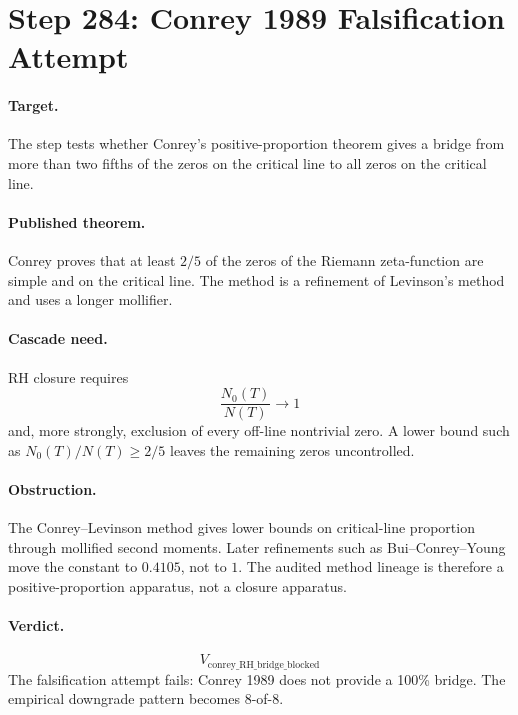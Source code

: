 \section*{Step 284: Conrey 1989 Falsification Attempt}

\paragraph{Target.}
The step tests whether Conrey's positive-proportion theorem gives a bridge from more than two fifths of the zeros on the critical line to all zeros on the critical line.

\paragraph{Published theorem.}
Conrey proves that at least \(2/5\) of the zeros of the Riemann zeta-function are simple and on the critical line.  The method is a refinement of Levinson's method and uses a longer mollifier.

\paragraph{Cascade need.}
RH closure requires
\[
  \frac{N_0(T)}{N(T)} \to 1
\]
and, more strongly, exclusion of every off-line nontrivial zero.  A lower bound such as \(N_0(T)/N(T) \ge 2/5\) leaves the remaining zeros uncontrolled.

\paragraph{Obstruction.}
The Conrey--Levinson method gives lower bounds on critical-line proportion through mollified second moments.  Later refinements such as Bui--Conrey--Young move the constant to \(0.4105\), not to \(1\).  The audited method lineage is therefore a positive-proportion apparatus, not a closure apparatus.

\paragraph{Verdict.}
\[
  \boxed{V_{\mathrm{conrey\_RH\_bridge\_blocked}}}
\]
The falsification attempt fails: Conrey 1989 does not provide a 100\% bridge.  The empirical downgrade pattern becomes 8-of-8.
